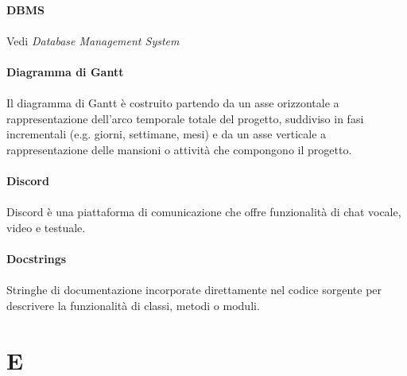 \documentclass[10pt, a4paper]{article}
\begin{document}
\vspace{2em}
\paragraph{DBMS}\noindent\hrulefill
\paragraph{}Vedi \textit{Database Management System\pg}




\vspace{2em}
\paragraph{Diagramma di Gantt}\noindent\hrulefill
\paragraph{}Il diagramma di Gantt è costruito partendo da un asse orizzontale a rappresentazione dell’arco temporale
totale del progetto, suddiviso in fasi incrementali (e.g. giorni, settimane, mesi) e da un asse
verticale a rappresentazione delle mansioni o attività che compongono il progetto.

\vspace{2em}
\paragraph{Discord}\noindent\hrulefill
\paragraph{}Discord è una piattaforma di comunicazione che offre funzionalità di chat vocale, video e testuale.

\vspace{2em}
\paragraph{Docstrings}\noindent\hrulefill
\paragraph{}Stringhe di documentazione incorporate direttamente nel codice sorgente per descrivere la funzionalità di classi, metodi o moduli.



\newpage
\section{E}
\vspace{2em}
\end{document}

